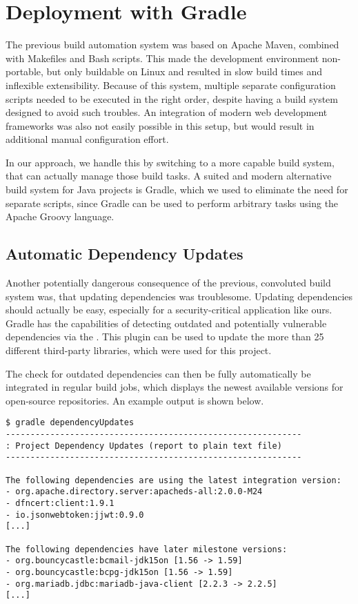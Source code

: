 \section{Deployment with Gradle}\label{sec:deploymentWithGradle}
The previous build automation system was based on Apache Maven, combined with Makefiles and Bash scripts.
This made the development environment non-portable, but only buildable on Linux and resulted in slow build times and
inflexible extensibility.
Because of this system, multiple separate configuration scripts needed to be executed in the right order, despite having
a build system designed to avoid such troubles.
An integration of modern web development frameworks was also not easily possible in this setup, but would result in
additional manual configuration effort.

In our approach, we handle this by switching to a more capable build system, that can actually manage those build tasks.
A suited and modern alternative build system for Java projects is Gradle, which we used to eliminate the need for
separate scripts, since Gradle can be used to perform arbitrary tasks using the Apache Groovy language.

\subsection*{Automatic Dependency Updates}
Another potentially dangerous consequence of the previous, convoluted build system was, that updating dependencies was
troublesome.
Updating dependencies should actually be easy, especially for a security-critical application like ours.
Gradle has the capabilities of detecting outdated and potentially vulnerable dependencies via the
.
This plugin can be used to update the more than 25 different third-party libraries, which were used for this project.

The check for outdated dependencies can then be fully automatically be integrated in regular build jobs, which displays
the newest available versions for open-source repositories.
An example output is shown below.

\begin{minipage}{\linewidth}
\begin{lstlisting}[caption={Example output of the gradle-versions-plugin}]
$ gradle dependencyUpdates
------------------------------------------------------------
: Project Dependency Updates (report to plain text file)
------------------------------------------------------------

The following dependencies are using the latest integration version:
- org.apache.directory.server:apacheds-all:2.0.0-M24
- dfncert:client:1.9.1
- io.jsonwebtoken:jjwt:0.9.0
[...]

The following dependencies have later milestone versions:
- org.bouncycastle:bcmail-jdk15on [1.56 -> 1.59]
- org.bouncycastle:bcpg-jdk15on [1.56 -> 1.59]
- org.mariadb.jdbc:mariadb-java-client [2.2.3 -> 2.2.5]
[...]
\end{lstlisting}
\end{minipage}

